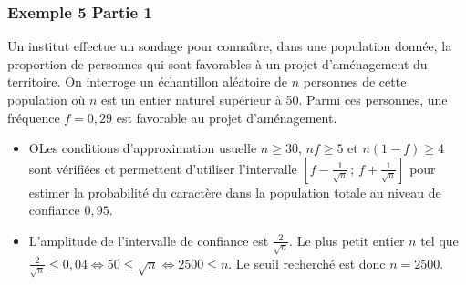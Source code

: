 \documentclass[xcolor=svgnames,t,final]{beamer}
\newcommand{\Interff}[2]{\left[#1\, ;\, #2\right]}
\begin{document}
\begin{frame}
\frametitle{Exemple 5 Partie 1}

\label{exemple5}

Un institut effectue un sondage pour connaître, dans une population donnée, la proportion de personnes qui sont favorables à un projet d'aménagement du territoire. On interroge un échantillon aléatoire de $n$ personnes de cette population où $n$ est un entier naturel supérieur à 50.  Parmi ces personnes, une fréquence $f=0,29$ est  favorable au projet d'aménagement.



\begin{itemize}
\pause \item OLes conditions d'approximation usuelle $n \geqslant 30$, $nf \geqslant 5$ et $n(1-f) \geqslant 4$ sont vérifiées et permettent d'utiliser l'intervalle $\Interff{f-\frac{1}{\sqrt{n}}}{f+\frac{1}{\sqrt{n}}}$ pour estimer la probabilité du caractère dans la population totale au niveau de confiance $0,95$.
\pause \item L'amplitude de l'intervalle de confiance est $\frac{2}{\sqrt{n}}$. Le plus petit entier $n$ tel que  $\frac{2}{\sqrt{n}} \leqslant 0,04 \Leftrightarrow 50 \leqslant \sqrt{n} \Leftrightarrow 2500 \leqslant n$.
Le seuil recherché est donc $n=2500$.

\end{itemize}

\end{frame}
\end{document}
